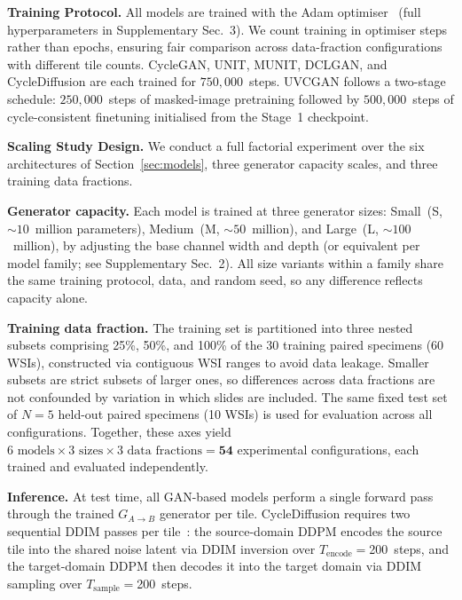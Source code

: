

\textbf{Training Protocol.}
All models are trained with the Adam optimiser~\cite{kingma2015adam} (full hyperparameters
in Supplementary Sec.~3). We count training in optimiser steps rather than epochs,
ensuring fair comparison across data-fraction configurations with different tile counts.
CycleGAN, UNIT, MUNIT, DCLGAN, and CycleDiffusion are each trained for $750{,}000$~steps.
UVCGAN follows a two-stage schedule: $250{,}000$~steps of masked-image pretraining
followed by $500{,}000$~steps of cycle-consistent finetuning initialised from the
Stage~1 checkpoint.

\noindent\textbf{Scaling Study Design.}
We conduct a full factorial experiment over the six architectures of
Section~\ref{sec:models}, three generator capacity scales, and three training data
fractions.

\noindent\textbf{Generator capacity.}
Each model is trained at three generator sizes: Small~(S, ${\sim}10$~million parameters),
Medium~(M, ${\sim}50$~million), and Large~(L, ${\sim}100$~million), by adjusting the
base channel width and depth (or equivalent per model family; see Supplementary
Sec.~2).
All size variants within a family share the same training protocol, data, and random
seed, so any difference reflects capacity alone.

\noindent\textbf{Training data fraction.}
The training set is partitioned into three nested subsets comprising 25\%, 50\%, and
100\% of the 30 training paired specimens (60 WSIs), constructed via contiguous WSI ranges
to avoid data leakage.
Smaller subsets are strict subsets of larger ones, so differences across data fractions
are not confounded by variation in which slides are included.
The same fixed test set of $N{=}5$ held-out paired specimens (10 WSIs) is used for
evaluation across all configurations.
Together, these axes yield $6\text{ models} \times 3\text{ sizes} \times 3\text{ data
fractions} = \mathbf{54}$ experimental configurations, each trained and evaluated
independently.

\noindent\textbf{Inference.}
At test time, all GAN-based models perform a single forward pass through the trained
$G_{A \to B}$ generator per tile.
CycleDiffusion requires two sequential DDIM passes per tile~\cite{song2021ddim}: the
source-domain DDPM encodes the source tile into the shared noise latent via DDIM
inversion over $T_{\text{encode}}{=}$200~steps, and the target-domain DDPM then decodes
it into the target domain via DDIM sampling over $T_{\text{sample}}{=}$200~steps.

